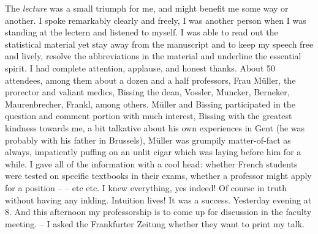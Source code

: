 
\missing

The \textit{lecture} was a small triumph for me, and might benefit me some way or another. I spoke remarkably clearly and freely, I was another person when I was standing at the lectern and listened to myself. I was able to read out the statistical material yet stay away from the manuscript and to keep my speech free and lively, resolve the abbreviations in the material and underline the essential spirit. I had complete attention, applause, and honest thanks. About 50 attendees, among them about a dozen and a half professors, Frau Müller, the prorector and valiant medics, Bissing the dean, Vossler, Muncker, Berneker, Maurenbrecher, Frankl, among others. Müller and Bissing participated in the question and comment portion with much interest, Bissing with the greatest kindness towards me, a bit talkative about his own experiences in Gent (he was probably with his father in Brussels), Müller was grumpily matter-of-fact as always, impatiently puffing on an unlit cigar which was laying before him for a while. I gave all of the information with a cool head: whether French students were tested on specific textbooks in their exams, whether a professor might apply for a position --  -- etc etc. I knew everything, yes indeed! Of course in truth without having any inkling. Intuition lives! \missing It was a success. Yesterday evening at 8. And this afternoon my professorship is to come up for discussion in the faculty meeting. -- I asked the Frankfurter Zeitung whether they want to print my talk.

\missing